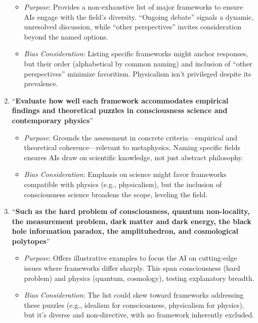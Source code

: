 \begin{enumerate}
  \begin{itemize}
  \tightlist
  \item
    \emph{Purpose}: Provides a non-exhaustive list of major frameworks
    to ensure AIs engage with the field's diversity. ``Ongoing debate''
    signals a dynamic, unresolved discussion, while ``other
    perspectives'' invites consideration beyond the named options.
  \item
    \emph{Bias Consideration}: Listing specific frameworks might anchor
    responses, but their order (alphabetical by common naming) and
    inclusion of ``other perspectives'' minimize favoritism. Physicalism
    isn't privileged despite its prevalence.
  \end{itemize}
\item
  ``\textbf{Evaluate how well each framework accommodates empirical
  findings and theoretical puzzles in consciousness science and
  contemporary physics}''

  \begin{itemize}
  \tightlist
  \item
    \emph{Purpose}: Grounds the assessment in concrete
    criteria---empirical and theoretical coherence---relevant to
    metaphysics. Naming specific fields ensures AIs draw on scientific
    knowledge, not just abstract philosophy.
  \item
    \emph{Bias Consideration}: Emphasis on science might favor
    frameworks compatible with physics (e.g., physicalism), but the
    inclusion of consciousness science broadens the scope, leveling the
    field.
  \end{itemize}
\item
  ``\textbf{Such as the hard problem of consciousness, quantum
  non-locality, the measurement problem, dark matter and dark energy,
  the black hole information paradox, the amplituhedron, and
  cosmological polytopes}''

  \begin{itemize}
  \tightlist
  \item
    \emph{Purpose}: Offers illustrative examples to focus the AI on
    cutting-edge issues where frameworks differ sharply. This span
    consciousness (hard problem) and physics (quantum, cosmology),
    testing explanatory breadth.
  \item
    \emph{Bias Consideration}: The list could skew toward frameworks
    addressing these puzzles (e.g., idealism for consciousness,
    physicalism for physics), but it's diverse and non-directive, with
    no framework inherently excluded.
  \end{itemize}
\end{enumerate}

